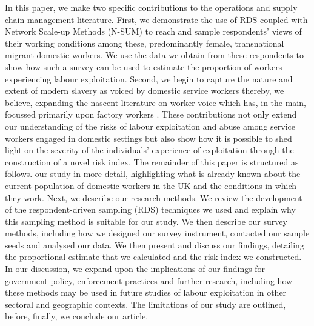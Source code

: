 \documentclass[
  12pt,
  letterpaper,
  DIV=11,
  numbers=noendperiod]{scrartcl}
\theoremstyle{plain}
\theoremstyle{definition}
\begin{document}
In this paper, we make two specific contributions to the operations and
supply chain management literature. First, we demonstrate the use of RDS
coupled with Network Scale-up Methods (N-SUM) to reach and sample
respondents' views of their working conditions among these,
predominantly female, transnational migrant domestic workers. We use the
data we obtain from these respondents to show how such a survey can be
used to estimate the proportion of workers experiencing labour
exploitation. Second, we begin to capture the nature and extent of
modern slavery as voiced by domestic service workers thereby, we
believe, expanding the nascent literature on worker voice which has, in
the main, focussed primarily upon factory workers 
\autocite{stephens_theorising_2024}. These contributions
not only extend our understanding of the risks of labour exploitation
and abuse among service workers engaged in domestic settings but also
show how it is possible to shed light on the severity of the
individuals' experience of exploitation through the construction of a
novel risk index. The remainder of this paper is structured as follows.
our study in more detail, highlighting what is already known about the
current population of domestic workers in the UK and the conditions in
which they work. Next, we describe our research methods. We review the
development of the respondent-driven sampling (RDS) techniques we used
and explain why this sampling method is suitable for our study. We then
describe our survey methods, including how we designed our survey
instrument, contacted our sample seeds and analysed our data. We then
present and discuss our findings, detailing the proportional estimate
that we calculated and the risk index we constructed. In our discussion,
we expand upon the implications of our findings for government policy,
enforcement practices and further research, including how these methods
may be used in future studies of labour exploitation in other sectoral
and geographic contexts. The limitations of our study are outlined,
before, finally, we conclude our article.
\end{document}
